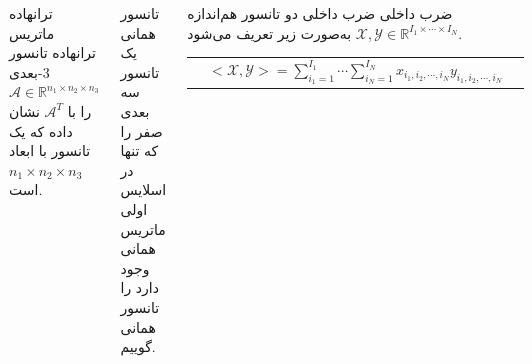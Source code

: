 \begin{frame}
\small{
\begin{columns}[T,onlytextwidth]
	\begin{exampleblock}{ترانهاده ماتریس}
		ترانهاده تانسور 3-بعدی
		$\mathcal{A}\in\mathbb{R}^{n_1\times n_2\times n_3}$
		را با $\mathcal{A}^T$ نشان داده که یک تانسور با ابعاد
		$n_1\times n_2\times n_3$
		است.
		
	\end{exampleblock}\pause
	\begin{alertblock}{تانسور همانی}
		یک تانسور سه بعدی صفر را که تنها در اسلایس اولی ماتریس همانی وجود دارد را تانسور همانی گوییم.
	\end{alertblock}\pause
	\begin{block}{ضرب داخلی}
	ضرب داخلی	دو تانسور هم‌اندازه
		$\mathcal{X},\mathcal{Y}\in \mathbb{R}^{I_1\times\cdots \times I_N}$
		به‌صورت زیر تعریف می‌شود.
		\begin{center}
			\begin{tabular}{ccc}
			&$
			<\mathcal{X},\mathcal{Y}>=\displaystyle\sum_{i_1=1}^{I_1}\cdots \sum_{i_N=1}^{I_N}
			x_{i_1,i_2,\cdots,i_N}y_{i_1,i_2,\cdots,i_N}
			$&
		\end{tabular}
		\end{center}		
	\end{block}
\end{columns}
}
\end{frame}

